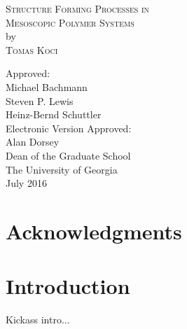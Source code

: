 \documentclass[12pt]{report}
\begin{document}
\newpage
\thispagestyle{empty}
\vspace*{18pt}
\begin{center}
\textsc{Structure Forming Processes in\\Mesoscopic Polymer Systems}\\[18pt]
by\\[18pt]
\textsc{Tomas Koci}
\end{center}
\vfill
\begin{flushleft}\singlespacing
\hskip 200pt {Approved:}\\
\vskip 12pt
\hspace*{200pt}Michael Bachmann\\
\vskip 12pt
\hspace*{200pt}Steven P. Lewis\\
\hspace*{200pt}\makebox[100pt][l]{~                }Heinz-Bernd Schuttler\\
\vfill
Electronic Version Approved:\\[12pt]
Alan Dorsey\\
Dean of the Graduate School\\
The University of Georgia\\
July 2016
\end{flushleft}



\chapter*{Acknowledgments}
\setcounter{page}{4}

\setcounter{tocdepth}{1}
\tableofcontents
\listoffigures  %
\listoftables %
\chapter{Introduction}
\setcounter{page}{1}
Kickass intro...
\end{document}
